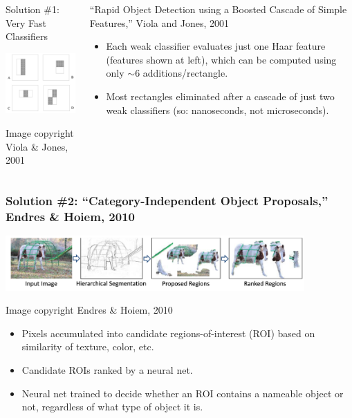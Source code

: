 \documentclass{beamer}
\begin{document}
\begin{frame}
  \begin{columns}
    \column{2.25in}
    \begin{block}{Solution \#1: Very Fast Classifiers}
      \centerline{\includegraphics[width=2.15in]{figs/violajones_fig1.png}}
      \begin{tiny}Image copyright Viola \& Jones, 2001\end{tiny}
    \end{block}
    \column{2.25in}
    \begin{block}{``Rapid Object Detection using a Boosted Cascade of Simple Features,'' Viola and Jones, 2001}
      \begin{itemize}
      \item Each weak classifier evaluates just one Haar feature
        (features shown at left), which can be computed using only
        $\sim 6$ additions/rectangle.
      \item Most rectangles eliminated after a cascade of just two
        weak classifiers (so: nanoseconds, not microseconds).
      \end{itemize}
    \end{block}
  \end{columns}
\end{frame}

\begin{frame}
  \frametitle{Solution \#2: ``Category-Independent Object Proposals,'' Endres \& Hoiem, 2010}
  \centerline{\includegraphics[width=4.5in]{figs/endres_hoiem_fig1.png}}
  \begin{tiny}Image copyright Endres \& Hoiem, 2010\end{tiny}
  \begin{itemize}
  \item Pixels accumulated into candidate regions-of-interest
    (ROI) based on similarity of texture, color, etc.
  \item Candidate ROIs ranked by a neural net.
  \item Neural net trained to decide whether an ROI contains a
    nameable object or not, regardless of what type of object it
    is.
  \end{itemize}
\end{frame}
\end{document}

